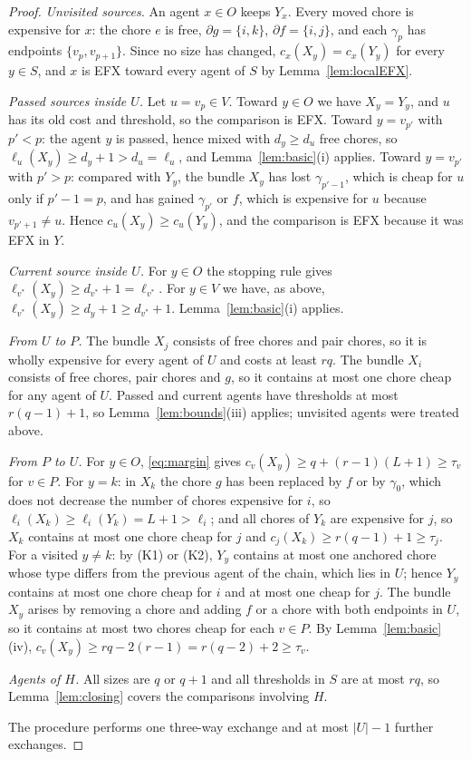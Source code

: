 \documentclass{amsart}
\numberwithin{equation}{section}
\theoremstyle{definition}
\theoremstyle{remark}
\newcommand{\bd}{\partial}
\begin{document}
\begin{proof}
\emph{Unvisited sources.} An agent $x\in O$ keeps $Y_x$. Every moved chore is expensive for $x$: the chore $e$ is free, $\bd g=\{i,k\}$, $\bd f=\{i,j\}$, and each $\gamma_p$ has endpoints $\{v_p,v_{p+1}\}$. Since no size has changed, $c_x(X_y)=c_x(Y_y)$ for every $y\in S$, and $x$ is EFX toward every agent of $S$ by Lemma~\ref{lem:localEFX}.

\emph{Passed sources inside $U$.} Let $u=v_p\in V$. Toward $y\in O$ we have $X_y=Y_y$, and $u$ has its old cost and threshold, so the comparison is EFX. Toward $y=v_{p'}$ with $p'<p$: the agent $y$ is passed, hence mixed with $d_y\ge d_u$ free chores, so $\ell_u(X_y)\ge d_y+1>d_u=\ell_u$, and Lemma~\ref{lem:basic}(i) applies. Toward $y=v_{p'}$ with $p'>p$: compared with $Y_y$, the bundle $X_y$ has lost $\gamma_{p'-1}$, which is cheap for $u$ only if $p'-1=p$, and has gained $\gamma_{p'}$ or $f$, which is expensive for $u$ because $v_{p'+1}\ne u$. Hence $c_u(X_y)\ge c_u(Y_y)$, and the comparison is EFX because it was EFX in $Y$.

\emph{Current source inside $U$.} For $y\in O$ the stopping rule gives $\ell_{v^*}(X_y)\ge d_{v^*}+1=\ell_{v^*}$. For $y\in V$ we have, as above, $\ell_{v^*}(X_y)\ge d_y+1\ge d_{v^*}+1$. Lemma~\ref{lem:basic}(i) applies.

\emph{From $U$ to $P$.} The bundle $X_j$ consists of free chores and pair chores, so it is wholly expensive for every agent of $U$ and costs at least $rq$. The bundle $X_i$ consists of free chores, pair chores and $g$, so it contains at most one chore cheap for any agent of $U$. Passed and current agents have thresholds at most $r(q-1)+1$, so Lemma~\ref{lem:bounds}(iii) applies; unvisited agents were treated above.

\emph{From $P$ to $U$.} For $y\in O$, \eqref{eq:margin} gives $c_v(X_y)\ge q+(r-1)(L+1)\ge\tau_v$ for $v\in P$. For $y=k$: in $X_k$ the chore $g$ has been replaced by $f$ or by $\gamma_0$, which does not decrease the number of chores expensive for $i$, so $\ell_i(X_k)\ge\ell_i(Y_k)=L+1>\ell_i$; and all chores of $Y_k$ are expensive for $j$, so $X_k$ contains at most one chore cheap for $j$ and $c_j(X_k)\ge r(q-1)+1\ge\tau_j$. For a visited $y\ne k$: by (K1) or (K2), $Y_y$ contains at most one anchored chore whose type differs from the previous agent of the chain, which lies in $U$; hence $Y_y$ contains at most one chore cheap for $i$ and at most one cheap for $j$. The bundle $X_y$ arises by removing a chore and adding $f$ or a chore with both endpoints in $U$, so it contains at most two chores cheap for each $v\in P$. By Lemma~\ref{lem:basic}(iv), $c_v(X_y)\ge rq-2(r-1)=r(q-2)+2\ge\tau_v$.

\emph{Agents of $H$.} All sizes are $q$ or $q+1$ and all thresholds in $S$ are at most $rq$, so Lemma~\ref{lem:closing} covers the comparisons involving $H$.

The procedure performs one three-way exchange and at most $|U|-1$ further exchanges.
\end{proof}
\end{document}

